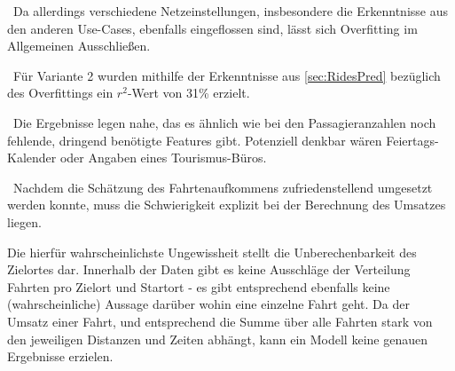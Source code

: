 ~\newline Da allerdings verschiedene Netzeinstellungen, insbesondere die Erkenntnisse aus den anderen Use-Cases, ebenfalls eingeflossen sind, lässt sich Overfitting im Allgemeinen Ausschließen. 

~\newline Für Variante 2 wurden mithilfe der Erkenntnisse aus \ref{sec:RidesPred} bezüglich des Overfittings ein $r^2$-Wert von 31\% erzielt.

~\newline Die Ergebnisse legen nahe, das es ähnlich wie bei den Passagieranzahlen noch fehlende, dringend benötigte Features gibt. Potenziell denkbar wären Feiertags-Kalender oder Angaben eines Tourismus-Büros.  

~\newline Nachdem die Schätzung des Fahrtenaufkommens zufriedenstellend umgesetzt werden konnte, muss die Schwierigkeit explizit bei der Berechnung des Umsatzes liegen. 

Die hierfür wahrscheinlichste Ungewissheit stellt die Unberechenbarkeit des Zielortes dar. Innerhalb der Daten gibt es keine Ausschläge der Verteilung Fahrten pro Zielort und Startort - es gibt entsprechend ebenfalls keine (wahrscheinliche) Aussage darüber wohin eine einzelne Fahrt geht. Da der Umsatz einer Fahrt, und entsprechend die Summe über alle Fahrten stark von den jeweiligen Distanzen und Zeiten abhängt, kann ein Modell keine genauen Ergebnisse erzielen.